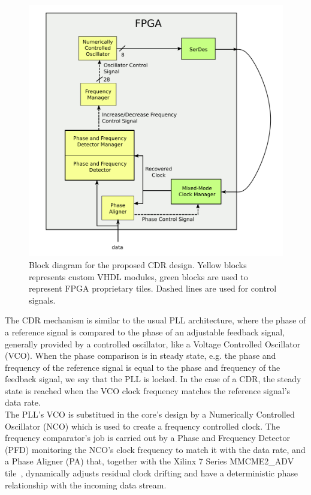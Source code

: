 \documentclass[11pt]{article}
\renewcommand{\>}{\rangle} \renewcommand{\emptyset}{\varnothing}
\begin{document}
\begin{figure}[H]
  \centerline{\includegraphics[width=0.5\linewidth]{images/block}}
  \caption{Block diagram for the proposed CDR design. Yellow blocks represents
    custom VHDL modules, green blocks are used to represent FPGA proprietary
    tiles. Dashed lines are used for control signals.}
  \label{fig:cdr_overview}
\end{figure}

The CDR mechanism is similar to the usual PLL architecture, where the phase of a
reference signal is compared to the phase of an adjustable feedback signal,
generally provided by a controlled oscillator, like a Voltage Controlled
Oscillator (VCO). When the phase comparison is in steady state, e.g. the phase
and frequency of the reference signal is equal to the phase and frequency of the
feedback signal, we say that the PLL is locked. In the case of a CDR, the steady
state is reached when the VCO clock frequency
matches the reference signal's data rate.\\
The PLL's VCO is substitued in the core's design by a Numerically Controlled
Oscillator (NCO) which is used to create a frequency controlled clock. The
frequency comparator's job is carried out by a Phase and Frequency Detector
(PFD) monitoring the NCO's clock frequency to match it with the data rate, and a
Phase Aligner (PA) that, together with the Xilinx 7 Series MMCME2\_ADV
tile~\cite{ref:mmcm}, dynamically adjusts residual clock drifting and have a
deterministic phase
relationship with the incoming data stream.\\
\end{document}
